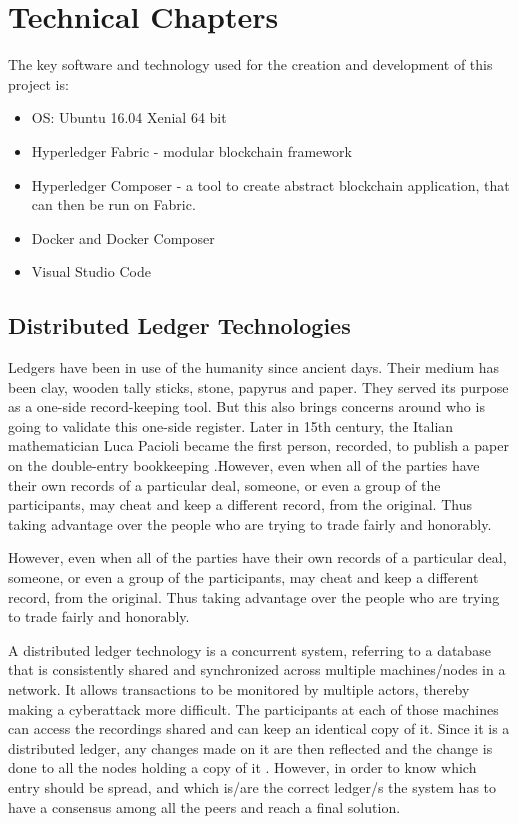 \documentclass[a4paper,11pt]{report}
\begin{document}

\chapter{Technical Chapters}            %

\label{technical}

The key software and technology used for the creation and development of this project is:
\begin{itemize}
\item OS: Ubuntu 16.04 Xenial 64 bit
\item Hyperledger Fabric - modular blockchain framework
\item Hyperledger Composer - a tool to create abstract blockchain application, that can then be run on Fabric.
\item Docker and Docker Composer
\item Visual Studio Code
\end{itemize}


\section{Distributed Ledger Technologies}

\label{dlt}

Ledgers have been in use of the humanity since ancient days. Their medium has been clay, wooden tally sticks, stone, papyrus and paper. They served its purpose as a one-side record-keeping tool. But this also brings concerns around who is going to validate this one-side register. Later in 15th century, the Italian mathematician Luca Pacioli became the first person, recorded, to publish a paper on the double-entry bookkeeping \cite{ledgers}.However, even when all of the parties have their own records of a particular deal, someone, or even a group of the participants, may cheat and keep a different record, from the original. Thus taking advantage over the people who are trying to trade fairly and honorably.

However, even when all of the parties have their own records of a particular deal, someone, or even a group of the participants, may cheat and keep a different record, from the original. Thus taking advantage over the people who are trying to trade fairly and honorably.

A distributed ledger technology is a concurrent system, referring to a database that is consistently shared and synchronized across multiple machines/nodes in a network. It allows transactions to be monitored by multiple actors, thereby making a cyberattack more difficult. The participants at each of those machines can access the recordings shared and can keep an identical copy of it. Since it is a distributed ledger, any changes made on it are then reflected and the change is done to all the nodes holding a copy of it \cite{dltref} . However, in order to know which entry should be spread, and which is/are the correct ledger/s the system has to have a consensus among all the peers and reach a final solution.
\end{document}
